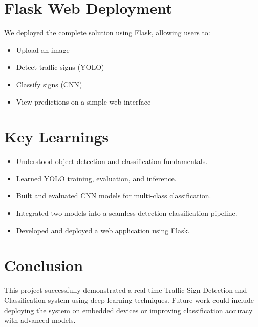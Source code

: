 \documentclass[12pt]{article}
\begin{document}
\section{Flask Web Deployment}
We deployed the complete solution using Flask, allowing users to:
\begin{itemize}
    \item Upload an image
    \item Detect traffic signs (YOLO)
    \item Classify signs (CNN)
    \item View predictions on a simple web interface
\end{itemize}



\section{Key Learnings}
\begin{itemize}
    \item Understood object detection and classification fundamentals.
    \item Learned YOLO training, evaluation, and inference.
    \item Built and evaluated CNN models for multi-class classification.
    \item Integrated two models into a seamless detection-classification pipeline.
    \item Developed and deployed a web application using Flask.
\end{itemize}

\section{Conclusion}
This project successfully demonstrated a real-time Traffic Sign Detection and Classification system using deep learning techniques. Future work could include deploying the system on embedded devices or improving classification accuracy with advanced models.
\end{document}
